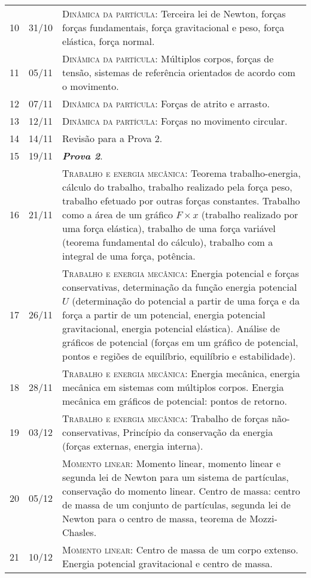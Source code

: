 \begin{center}
\begin{longtable}{ccp{70mm}}
10	 & 	31/10	 & 	\textsc{Dinâmica da partícula:} Terceira lei de Newton, forças forças fundamentais, força gravitacional e peso, força elástica, força normal. \\
11	 & 	05/11	 & 	\textsc{Dinâmica da partícula:} Múltiplos corpos, forças de tensão, sistemas de referência orientados de acordo com o movimento. \\
12	 & 	07/11	 & 	\textsc{Dinâmica da partícula:} Forças de atrito e arrasto. \\
13	 & 	12/11	 & 	\textsc{Dinâmica da partícula:} Forças no movimento circular. \\
14	 & 	14/11	 & 	Revisão para a Prova 2. \\
15	 & 	19/11	 & 	\textbf{\textit{Prova 2}}. \\
16	 & 	21/11	 & 	\textsc{Trabalho e energia mecânica:} Teorema trabalho-energia, cálculo do trabalho, trabalho realizado pela força peso, trabalho efetuado por outras forças constantes. Trabalho como a área de um gráfico $F \times x$ (trabalho realizado por uma força elástica), trabalho de uma força variável (teorema fundamental do cálculo), trabalho com a integral de uma força, potência. \\
17	 & 	26/11	 & 	\textsc{Trabalho e energia mecânica:} Energia potencial e forças conservativas, determinação da função energia potencial $U$ (determinação do potencial a partir de uma força e da força a partir de um potencial, energia potencial gravitacional, energia potencial elástica). Análise de gráficos de potencial (forças em um gráfico de potencial, pontos e regiões de equilíbrio, equilíbrio e estabilidade). \\
18	 & 	28/11	 & 	\textsc{Trabalho e energia mecânica:} Energia mecânica, energia mecânica em sistemas com múltiplos corpos. Energia mecânica em gráficos de potencial: pontos de retorno. \\
19	 & 	03/12	 & 	\textsc{Trabalho e energia mecânica:} Trabalho de forças não-conservativas, Princípio da conservação da energia (forças externas, energia interna). \\
20	 & 	05/12	 & 	\textsc{Momento linear:} Momento linear, momento linear e segunda lei de Newton para um sistema de partículas, conservação do momento linear. Centro de massa: centro de massa de um conjunto de partículas, segunda lei de Newton para o centro de massa, teorema de Mozzi-Chasles. \\
21	 & 	10/12	 & 	\textsc{Momento linear:} Centro de massa de um corpo extenso. Energia potencial gravitacional e centro de massa. \\

\end{longtable}
\end{center}
